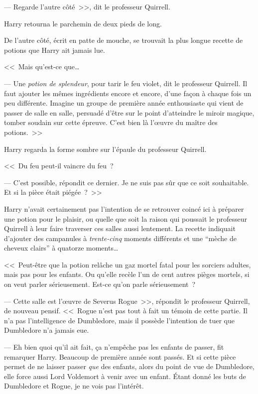 --- Regarde l'autre côté~>>, dit le professeur Quirrell.

Harry retourna le parchemin de deux pieds de long.

De l'autre côté, écrit en patte de mouche, se trouvait la plus longue recette de potions que Harry ait jamais lue.

<<~Mais qu'est-ce que…

--- Une \emph{potion de splendeur}, pour tarir le feu violet, dit le professeur Quirrell. Il faut ajouter les mêmes ingrédients encore et encore, d'une façon à chaque fois un peu différente. Imagine un groupe de première année enthousiaste qui vient de passer de salle en salle, persuadé d'être sur le point d'atteindre le miroir magique, tomber soudain sur cette épreuve. C'est bien là l'œuvre du maître des potions.~>>

Harry regarda la forme sombre sur l'épaule du professeur Quirrell.

<<~Du feu peut-il vaincre du feu~?

--- C'est possible, répondit ce dernier. Je ne suis pas sûr que ce soit souhaitable. Et si la pièce était piégée~?~>>

Harry n'avait certainement pas l'intention de se retrouver coincé ici à préparer une potion pour le plaisir, ou quelle que soit la raison qui poussait le professeur Quirrell à leur faire traverser ces salles aussi lentement. La recette indiquait d'ajouter des campanules à \emph{trente-cinq} moments différents et une “mèche de cheveux clairs” à quatorze moments…

<<~Peut-être que la potion relâche un gaz mortel fatal pour les sorciers adultes, mais pas pour les enfants. Ou qu'elle recèle l'un de cent autres pièges mortels, si on veut parler sérieusement. Est-ce qu'on parle sérieusement~?

--- Cette salle est l'œuvre de Severus Rogue~>>, répondit le professeur Quirrell, de nouveau pensif. <<~Rogue n'est pas tout à fait un témoin de cette partie. Il n'a pas l'intelligence de Dumbledore, mais il possède l'intention de tuer que Dumbledore n'a jamais eue.

--- Eh bien quoi qu'il ait fait, ça n'empêche pas les enfants de passer, fit remarquer Harry. Beaucoup de première année sont passés. Et si cette pièce permet de ne laisser passer \emph{que} des enfants, alors du point de vue de Dumbledore, elle force aussi Lord Voldemort à venir avec un enfant. Étant donné les buts de Dumbledore et Rogue, je ne vois pas l'intérêt.

